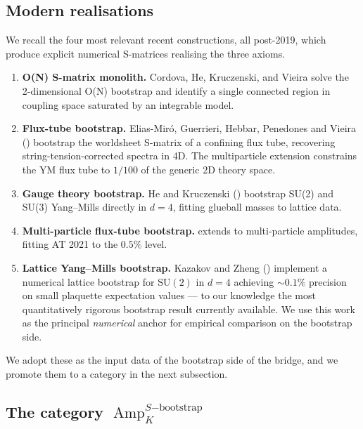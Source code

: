 \documentclass[11pt]{amsart}
\theoremstyle{definition}
\theoremstyle{remark}
\DeclareMathOperator{\Amp}{Amp}
\begin{document}
\subsection{Modern realisations}\label{ss:modern-realisations}

We recall the four most relevant recent constructions, all post-2019,
which produce explicit numerical S-matrices realising the three axioms.

\begin{enumerate}
\item \textbf{O(N) S-matrix monolith.} Cordova, He, Kruczenski, and
Vieira \cite{CordovaHeKruczenskiVieira} solve the 2-dimensional O(N)
bootstrap and identify a single connected region in coupling space
saturated by an integrable model.

\item \textbf{Flux-tube bootstrap.} Elias-Mir\'o, Guerrieri, Hebbar,
Penedones and Vieira (\cite{EliasMiroFluxTube}) bootstrap the worldsheet
S-matrix of a confining flux tube, recovering string-tension-corrected
spectra in 4D.  The multiparticle extension
\cite{GuerrieriHomrichFluxTube2025} constrains the YM flux tube to
$1/100$ of the generic $2$D theory space.

\item \textbf{Gauge theory bootstrap.} He and Kruczenski
(\cite{HeKruczenski23, HeKruczenski24}) bootstrap SU(2) and SU(3)
Yang--Mills directly in $d=4$, fitting glueball masses to lattice data.

\item \textbf{Multi-particle flux-tube bootstrap.} \cite{HeKruczenski24}
extends to multi-particle amplitudes, fitting AT 2021 to the
$0.5\%$ level.

\item \textbf{Lattice Yang--Mills bootstrap.} Kazakov and Zheng
(\cite{KazakovZheng2024}) implement a numerical lattice bootstrap for
$\mathrm{SU}(2)$ in $d = 4$ achieving $\sim 0.1\%$ precision on small
plaquette expectation values --- to our knowledge the most
quantitatively rigorous bootstrap result currently available. We use
this work as the principal \emph{numerical} anchor for empirical
comparison on the bootstrap side.
\end{enumerate}

We adopt these as the input data of the bootstrap side of the bridge,
and we promote them to a category in the next subsection.

\subsection{The category $\Amp_K^{S\mathrm{-bootstrap}}$}\label{ss:Amp-K}
\end{document}

